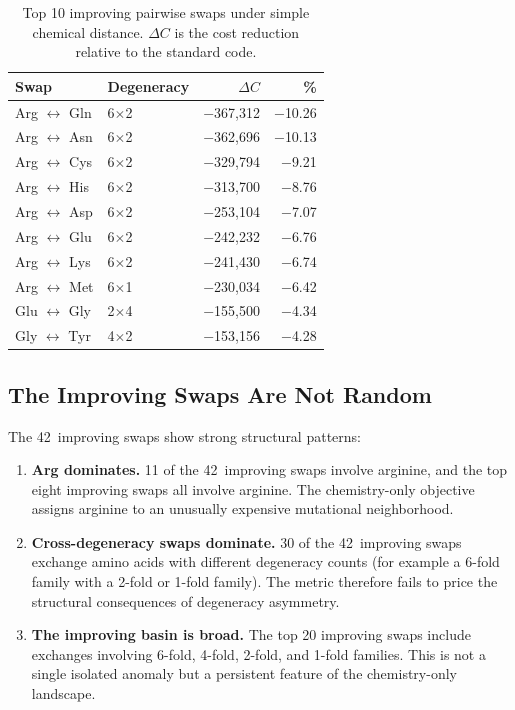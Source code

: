 \documentclass[11pt,twocolumn]{article}
\begin{document}
\begin{table}[t]
\centering
\caption{Top 10 improving pairwise swaps under simple chemical distance.
$\Delta C$ is the cost reduction relative to the standard code.}
\label{tab:top10}
\small
\begin{tabular}{@{}llrr@{}}
\toprule
Swap & Degeneracy & $\Delta C$ & \% \\
\midrule
Arg $\leftrightarrow$ Gln & 6$\times$2 & $-$367,312 & $-$10.26 \\
Arg $\leftrightarrow$ Asn & 6$\times$2 & $-$362,696 & $-$10.13 \\
Arg $\leftrightarrow$ Cys & 6$\times$2 & $-$329,794 & $-$9.21 \\
Arg $\leftrightarrow$ His & 6$\times$2 & $-$313,700 & $-$8.76 \\
Arg $\leftrightarrow$ Asp & 6$\times$2 & $-$253,104 & $-$7.07 \\
Arg $\leftrightarrow$ Glu & 6$\times$2 & $-$242,232 & $-$6.76 \\
Arg $\leftrightarrow$ Lys & 6$\times$2 & $-$241,430 & $-$6.74 \\
Arg $\leftrightarrow$ Met & 6$\times$1 & $-$230,034 & $-$6.42 \\
Glu $\leftrightarrow$ Gly & 2$\times$4 & $-$155,500 & $-$4.34 \\
Gly $\leftrightarrow$ Tyr & 4$\times$2 & $-$153,156 & $-$4.28 \\
\bottomrule
\end{tabular}
\end{table}

\subsection{The Improving Swaps Are Not Random}

The 42~improving swaps show strong structural patterns:

\begin{enumerate}
\item \textbf{Arg dominates.} 11 of the 42~improving swaps involve
  arginine, and the top eight improving swaps all involve arginine. The
  chemistry-only objective assigns arginine to an unusually expensive
  mutational neighborhood.

\item \textbf{Cross-degeneracy swaps dominate.} 30 of the 42~improving
  swaps exchange amino acids with different degeneracy counts (for example
  a 6-fold family with a 2-fold or 1-fold family). The metric therefore
  fails to price the structural consequences of degeneracy asymmetry.

\item \textbf{The improving basin is broad.} The top 20 improving swaps
  include exchanges involving 6-fold, 4-fold, 2-fold, and 1-fold families.
  This is not a single isolated anomaly but a persistent feature of the
  chemistry-only landscape.
\end{enumerate}
\end{document}

